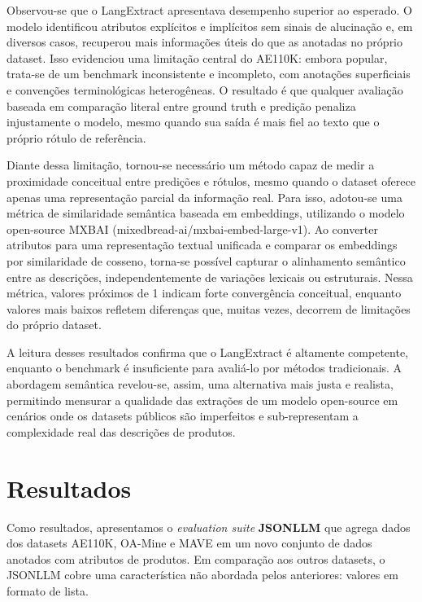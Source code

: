 Observou-se que o LangExtract apresentava desempenho superior ao esperado. O modelo identificou atributos explícitos e implícitos sem sinais de alucinação e, em diversos casos, recuperou mais informações úteis do que as anotadas no próprio dataset. Isso evidenciou uma limitação central do AE110K: embora popular, trata-se de um benchmark inconsistente e incompleto, com anotações superficiais e convenções terminológicas heterogêneas. O resultado é que qualquer avaliação baseada em comparação literal entre ground truth e predição penaliza injustamente o modelo, mesmo quando sua saída é mais fiel ao texto que o próprio rótulo de referência.

Diante dessa limitação, tornou-se necessário um método capaz de medir a proximidade conceitual entre predições e rótulos, mesmo quando o dataset oferece apenas uma representação parcial da informação real. Para isso, adotou-se uma métrica de similaridade semântica baseada em embeddings, utilizando o modelo open-source MXBAI (mixedbread-ai/mxbai-embed-large-v1). Ao converter atributos para uma representação textual unificada e comparar os embeddings por similaridade de cosseno, torna-se possível capturar o alinhamento semântico entre as descrições, independentemente de variações lexicais ou estruturais. Nessa métrica, valores próximos de 1 indicam forte convergência conceitual, enquanto valores mais baixos refletem diferenças que, muitas vezes, decorrem de limitações do próprio dataset.

A leitura desses resultados confirma que o LangExtract é altamente competente, enquanto o benchmark é insuficiente para avaliá-lo por métodos tradicionais. A abordagem semântica revelou-se, assim, uma alternativa mais justa e realista, permitindo mensurar a qualidade das extrações de um modelo open-source em cenários onde os datasets públicos são imperfeitos e sub-representam a complexidade real das descrições de produtos.

\section{Resultados} %

Como resultados, apresentamos o \textit{evaluation suite} \textbf{JSONLLM} que agrega dados dos datasets AE110K, OA-Mine e MAVE em um novo conjunto de dados anotados com atributos de produtos. Em comparação aos outros datasets, o JSONLLM cobre uma característica não abordada pelos anteriores: valores em formato de lista.

